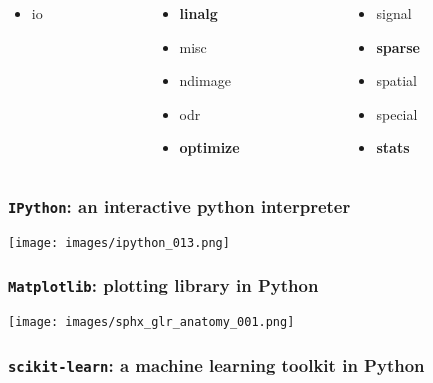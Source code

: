 \documentclass[xcolor=dvipsnames]{beamer}
\begin{document}
\begin{frame}
\begin{overlayarea}{12cm}{6cm}
{\begin{columns}
\begin{column}{0.3\linewidth}
\begin{itemize}[label={$\bullet$}]
\item io
\end{itemize}
\end{column}
\begin{column}{0.3\linewidth}
\begin{itemize}[label={$\bullet$}]
\item {\bf linalg}
\item misc
\item ndimage
\item odr
\item {\bf optimize}
\end{itemize}
\end{column}
\begin{column}{0.3\linewidth}
\begin{itemize}[label={$\bullet$}]
\item signal
\item {\bf sparse}
\item spatial
\item special
\item {\bf stats}
\end{itemize}
\end{column}
\end{columns}
}
\end{overlayarea}
\end{frame}

\begin{frame}
\frametitle{\texttt{IPython}: an interactive python interpreter}
\begin{center}
\texttt{[image: images/ipython\_013.png]}
\end{center}
\end{frame}

\begin{frame}
\frametitle{\texttt{Matplotlib}: plotting library in Python}
\begin{center}
\texttt{[image: images/sphx\_glr\_anatomy\_001.png]}
\end{center}
\end{frame}

\begin{frame}
\frametitle{\texttt{scikit-learn}: a machine learning toolkit in Python}
\begin{center}
\end{center}
\end{frame}
\end{document}
